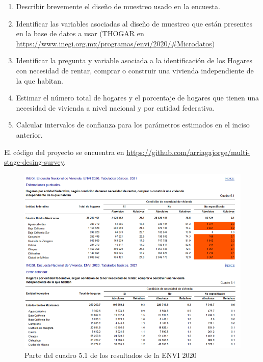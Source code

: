 \documentclass[
]{article}
\providecommand{\tightlist}{%
  \setlength{\itemsep}{0pt}\setlength{\parskip}{0pt}}
\begin{document}
\begin{enumerate}
\def\labelenumi{\roman{enumi}.}
\tightlist
\item
  Describir brevemente el diseño de muestreo usado en la encuesta.
\item
  Identificar las variables asociadas al diseño de muestreo que están
  presentes en la base de datos a usar (THOGAR en
  \url{https://www.inegi.org.mx/programas/envi/2020/\#Microdatos})
\item
  Identificar la pregunta y variable asociada a la identificación de los
  Hogares con necesidad de rentar, comprar o construir una vivienda
  independiente de la que habitan.
\item
  Estimar el número total de hogares y el porcentaje de hogares que tienen una necesidad de vivienda a nivel nacional y por entidad federativa.
\item
  Calcular intervalos de confianza para los parámetros estimados en el inciso anterior.
\end{enumerate}

El código del proyecto se encuentra en \href{https://github.com/arriagajorge/multi-stage-desing-survey}{https://github.com/arriagajorge/multi-stage-desing-survey}.

\begin{figure}[H]
\centering
    \includegraphics[width=160mm]{images/ENVI2020.png}
    \caption{Parte del cuadro 5.1 de los resultados de la ENVI 2020}
    \label{Envi2020}
\end{figure}
\end{document}
